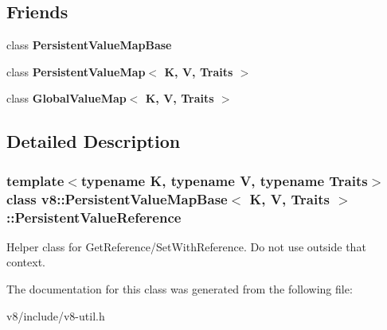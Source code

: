 \subsection*{Friends}
\begin{DoxyCompactItemize}
\item 
\hypertarget{classv8_1_1PersistentValueMapBase_1_1PersistentValueReference_ae5cccd63ef6d94c509ad8b6970d4017d}{}class {\bfseries Persistent\+Value\+Map\+Base}\label{classv8_1_1PersistentValueMapBase_1_1PersistentValueReference_ae5cccd63ef6d94c509ad8b6970d4017d}

\item 
\hypertarget{classv8_1_1PersistentValueMapBase_1_1PersistentValueReference_a22fcaa9f3ba179f3bb566eda5b93790d}{}class {\bfseries Persistent\+Value\+Map$<$ K, V, Traits $>$}\label{classv8_1_1PersistentValueMapBase_1_1PersistentValueReference_a22fcaa9f3ba179f3bb566eda5b93790d}

\item 
\hypertarget{classv8_1_1PersistentValueMapBase_1_1PersistentValueReference_a41811cde55d1ef227d1ba28778d95d08}{}class {\bfseries Global\+Value\+Map$<$ K, V, Traits $>$}\label{classv8_1_1PersistentValueMapBase_1_1PersistentValueReference_a41811cde55d1ef227d1ba28778d95d08}

\end{DoxyCompactItemize}


\subsection{Detailed Description}
\subsubsection*{template$<$typename K, typename V, typename Traits$>$class v8\+::\+Persistent\+Value\+Map\+Base$<$ K, V, Traits $>$\+::\+Persistent\+Value\+Reference}

Helper class for Get\+Reference/\+Set\+With\+Reference. Do not use outside that context. 

The documentation for this class was generated from the following file\+:\begin{DoxyCompactItemize}
\item 
v8/include/v8-\/util.\+h\end{DoxyCompactItemize}
